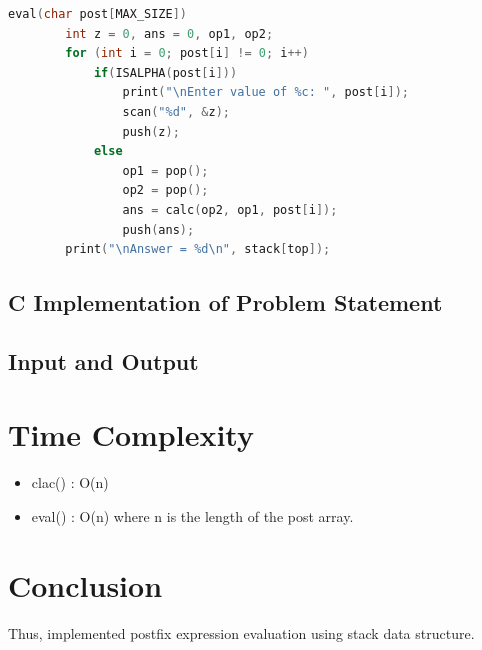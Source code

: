 \documentclass[11pt]{article}
\begin{document}
\begin{lstlisting}[language=C]
	eval(char post[MAX_SIZE])
		int z = 0, ans = 0, op1, op2;
		for (int i = 0; post[i] != 0; i++)
			if(ISALPHA(post[i]))
				print("\nEnter value of %c: ", post[i]);
				scan("%d", &z);
				push(z);
			else
				op1 = pop();
				op2 = pop();
				ans = calc(op2, op1, post[i]);
				push(ans);
		print("\nAnswer = %d\n", stack[top]);
\end{lstlisting}
\subsection{C Implementation of Problem Statement}



\subsection{Input and Output}


\section{Time Complexity}
\begin{itemize}
	\item clac() : O(n)
	\item eval() : O(n) where n is the length of the post array.
\end{itemize}

\section{Conclusion}
Thus, implemented postfix expression evaluation using stack data structure.
\end{document}
